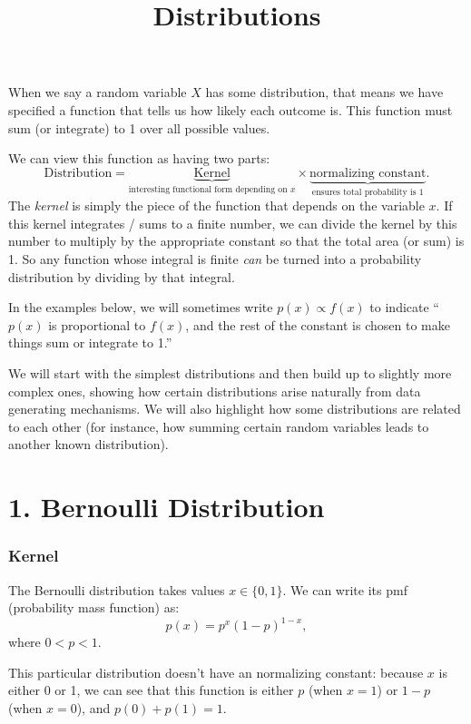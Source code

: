 \documentclass{article}
\title{Distributions}
\date{}
\begin{document}
\maketitle
\vspace{-1cm}

When we say a random variable \(X\) has some distribution, that means we have specified
a function that tells us how likely each outcome is. This function must sum (or integrate) to 1 over all possible values.

We can view this function as having two parts:
\[
\text{Distribution} = \underbrace{\text{Kernel}}_{\text{interesting functional form depending on } x}
\times
\underbrace{\text{normalizing constant}}_{\text{ensures total probability is } 1}.
\]
The \emph{kernel} is simply the piece of the function that depends on the variable \(x\). 
If this kernel integrates / sums to a finite number, we can divide the kernel by this number to multiply by the appropriate constant so that the total area (or sum) is 1.
So any function whose integral is finite \emph{can} be turned into a probability distribution by dividing by that integral.

In the examples below, we will sometimes write
\(\displaystyle p(x) \propto f(x)\)
to indicate ``\(p(x)\) is proportional to \(f(x)\), and the rest of the constant is chosen to make things sum or integrate to 1.''

We will start with the simplest distributions and then build up to slightly more complex ones, showing how certain distributions arise naturally from data generating mechanisms. 
We will also highlight how some distributions are related to each other (for instance, how summing certain random variables leads to another known distribution).

\section*{1. Bernoulli Distribution}

\subsubsection*{Kernel}
The Bernoulli distribution takes values \(x \in \{0, 1\}\).
We can write its pmf (probability mass function) as:
\[
p(x) = p^x (1-p)^{1-x}, 
\]
where \(0 < p < 1\). 

This particular distribution doesn't have an normalizing constant: because \(x\) is either 0 or 1, we can see that this function is either \(p\) (when \(x=1\)) or \(1-p\) (when \(x=0\)), and \(p(0) + p(1) = 1\).
\end{document}
